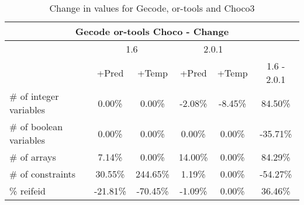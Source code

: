 \documentclass{standalone}
\begin{document}
\begin{table}[H]
\footnotesize
\centering
\begin{tabular}{lc|c|c|c|c}
\multicolumn{6}{c}{Gecode or-tools Choco - Change} \\ 
\hline\hline  & \multicolumn{2}{c|}{1.6} &\multicolumn{2}{c|}{2.0.1} &\\ 
\hline  & +Pred & +Temp & +Pred & +Temp & 1.6 - 2.0.1\\
\# of integer variables & 0.00\% & 0.00\% & -2.08\% & -8.45\% & 84.50\% \\ 
\# of boolean variables & 0.00\% & 0.00\% & 0.00\% & 0.00\% & -35.71\% \\ 
\# of arrays            & 7.14\% & 0.00\% & 14.00\% & 0.00\% & 84.29\% \\
\# of constraints       & 30.55\% & 244.65\% & 1.19\% & 0.00\% & -54.27\% \\ 
\% reifeid               & -21.81\% & -70.45\% & -1.09\% & 0.00\% & 36.46\%\\ 
\end{tabular}\caption{Change in values for Gecode, or-tools and Choco3}
\end{table}
\end{document}

